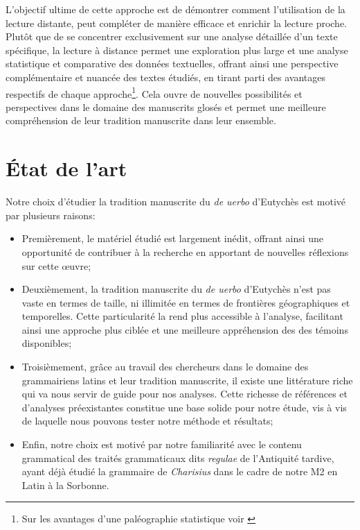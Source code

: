 \documentclass[a4paper, twoside, 12pt]{book}
\begin{document}
L'objectif ultime de cette approche est de démontrer comment l'utilisation de la lecture distante, peut compléter de manière efficace et enrichir la lecture proche. Plutôt que de se concentrer exclusivement sur une analyse détaillée d'un texte spécifique, la lecture à distance permet une exploration plus large et une analyse statistique et comparative des données textuelles, offrant ainsi une perspective complémentaire et nuancée des textes étudiés, en tirant parti des avantages respectifs de chaque approche\footnote{Sur les avantages d'une paléographie statistique voir \cite{stutzmann2011paleographie}}. Cela ouvre de nouvelles possibilités et perspectives dans le domaine des manuscrits glosés et permet une meilleure compréhension de leur tradition manuscrite dans leur ensemble.

\chapter{État de l'art}

Notre choix d'étudier la tradition manuscrite du \textit{de uerbo} d'Eutychès est motivé par plusieurs raisons:  \\
\begin{itemize}
    \item Premièrement, le matériel étudié est largement inédit, offrant ainsi une opportunité de contribuer à la recherche en apportant de nouvelles réflexions sur cette œuvre;
    \item Deuxièmement, la tradition manuscrite du \textit{de uerbo} d'Eutychès n'est pas vaste en termes de taille, ni illimitée en termes de frontières géographiques et temporelles. Cette particularité la rend plus accessible à l'analyse, facilitant ainsi une approche plus ciblée et une meilleure appréhension des des témoins disponibles;
    \item Troisièmement, grâce au travail des chercheurs dans le domaine des grammairiens latins et leur tradition manuscrite, il existe une littérature riche qui va nous servir de guide pour nos analyses. Cette richesse de références et d'analyses préexistantes constitue une base solide pour notre étude, vis à vis de laquelle nous pouvons tester notre méthode et résultats;
    \item Enfin, notre choix est motivé par notre familiarité avec le contenu grammatical des traités grammaticaux dits \textit{regulae} de l'Antiquité tardive, ayant déjà étudié la grammaire de \textit{Charisius} dans le cadre de notre M2 en Latin à la Sorbonne.
\end{itemize}
\end{document}
